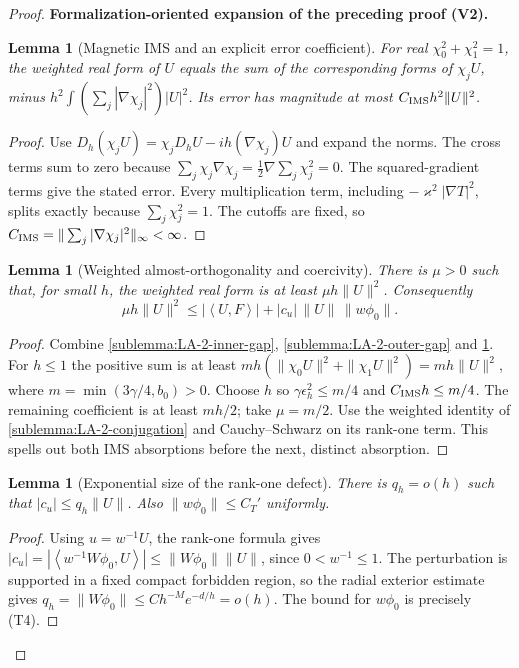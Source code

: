\documentclass[11pt]{article}
\newtheorem{lemma}[theorem]{Lemma}
\newcommand{\formalisationparentid}{X}
\newenvironment{formalisationaddition}[1]{\par\medskip\begingroup\color{blue}\def\formalisationparentid{#1}\setcounter{formalizationsublemma}{0}\let\lemma\formalizationsublemma\let\endlemma\endformalizationsublemma
  \def\Eo{\mathcal E_h^\circ}\def\EE{\mathcal E_h}\def\phio{\phi_h^\circ}\def\phih{\phi_h}\def\Ho{H_h^{\rm atom}(v^\circ)}\def\Ha{H_h^{\rm atom}}\def\HL{H_h^{L}}\def\Dh{D_h}\def\Log{\operatorname{Log}}\def\ellh{\ell_h}\def\Gp{G_{p,h}}\def\Ast{A_{*,h}}\def\ahat{\widehat{\mathfrak a}_h}\def\ah{\mathfrak a_h}\def\rh{\widehat\rho_h}\def\deltah{\widehat\delta_h}\def\oldref##1{\textup{(##1)}}\def\interface##1{\par\noindent\textit{Analytical interface used here.} ##1\par}\def\finish{\par\noindent\textit{Conclusion of the formalization-oriented expansion.} }\par\noindent\textbf{Formalization-oriented expansion of the preceding proof (V2).}\par\smallskip
}{\par\endgroup\medskip
}
\newcommand{\ip}[2]{\left\langle #1,#2\right\rangle}
\begin{document}
\begin{proof}
\begin{formalisationaddition}{LA.2}
\begin{lemma}[Magnetic IMS and an explicit error coefficient]\label{sublemma:LA-2-ims-error}
For real $\chi_0^2+\chi_1^2=1$, the weighted real form of $U$ equals
the sum of the corresponding forms of $\chi_jU$, minus
$h^2\int(\sum_j|\nabla\chi_j|^2)|U|^2$.
Its error has magnitude at most $C_{\rm IMS}h^2\|U\|^2$.
\end{lemma}
\begin{proof}
Use $D_h(\chi_jU)=\chi_jD_hU-ih(\nabla\chi_j)U$ and expand the norms.
The cross terms sum to zero because
$\sum_j\chi_j\nabla\chi_j=\frac12\nabla\sum_j\chi_j^2=0$.
The squared-gradient terms give the stated error. Every multiplication
term, including $-\varkappa^2|\nabla T|^2$, splits exactly because
$\sum_j\chi_j^2=1$. The cutoffs are fixed, so
$C_{\rm IMS}=\|\sum_j|\nabla\chi_j|^2\|_\infty<\infty$.
\end{proof}

\begin{lemma}[Weighted almost-orthogonality and coercivity]\label{sublemma:LA-2-coercivity}
There is $\mu>0$ such that, for small $h$, the weighted real form is at
least $\mu h\|U\|^2$. Consequently
\[
 \mu h\|U\|^2\le |\ip U F|+|c_u|\,\|U\|\,\|w\phi_0\|.
\]
\end{lemma}
\begin{proof}
Combine \ref{sublemma:LA-2-inner-gap},
\ref{sublemma:LA-2-outer-gap} and \ref{sublemma:LA-2-ims-error}.
For $h\le1$ the positive sum is at least
$m h(\|\chi_0U\|^2+\|\chi_1U\|^2)=mh\|U\|^2$,
where $m=\min(3\gamma/4,b_0)>0$.
Choose $h$ so $\gamma\epsilon_h^2\le m/4$ and
$C_{\rm IMS}h\le m/4$. The remaining coefficient is at least $mh/2$;
take $\mu=m/2$. Use the weighted identity of
\ref{sublemma:LA-2-conjugation} and Cauchy--Schwarz on its rank-one term.
This spells out both IMS absorptions before the next, distinct absorption.
\end{proof}

\begin{lemma}[Exponential size of the rank-one defect]\label{sublemma:LA-2-defect-small}
There is $q_h=o(h)$ such that $|c_u|\le q_h\|U\|$.
Also $\|w\phi_0\|\le C_T'$ uniformly.
\end{lemma}
\begin{proof}
Using $u=w^{-1}U$, the rank-one formula gives
$|c_u|=|\ip{w^{-1}W\phi_0}U|\le\|W\phi_0\|\|U\|$,
since $0<w^{-1}\le1$. The perturbation is supported in a fixed compact
forbidden region, so the radial exterior estimate gives
$q_h=\|W\phi_0\|\le Ch^{-M}e^{-d/h}=o(h)$.
The bound for $w\phi_0$ is precisely (T4).
\end{proof}


\end{formalisationaddition}
\end{proof}
\end{document}

